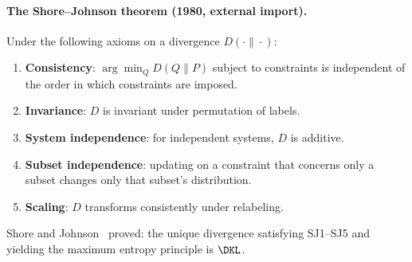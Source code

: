 \documentclass[12pt,a4paper]{article}
\begin{document}
\paragraph{The Shore--Johnson theorem (1980, external import).}
Under the following axioms on a divergence $D(\cdot\|\cdot)$:
\begin{enumerate}[label=(SJ\arabic*)]
\item \textbf{Consistency}: $\arg\min_Q D(Q\|P)$ subject to constraints
  is independent of the order in which constraints are imposed.
\item \textbf{Invariance}: $D$ is invariant under permutation of labels.
\item \textbf{System independence}: for independent systems, $D$ is additive.
\item \textbf{Subset independence}: updating on a constraint that concerns
  only a subset changes only that subset's distribution.
\item \textbf{Scaling}: $D$ transforms consistently under relabeling.
\end{enumerate}
Shore and Johnson~\cite{ShoreJohnson1980} proved: the unique divergence satisfying SJ1--SJ5
and yielding the maximum entropy principle is $\DKL$.
\end{document}
